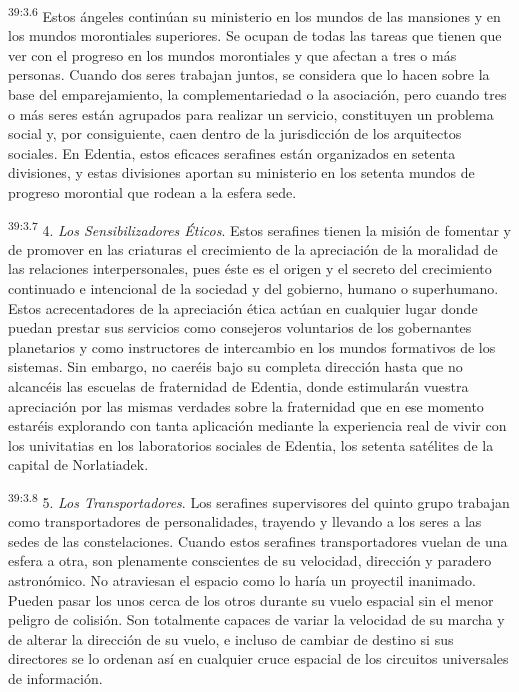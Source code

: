 \par
\textsuperscript{39:3.6} Estos ángeles continúan su ministerio en los mundos de las mansiones y en los mundos morontiales superiores. Se ocupan de todas las tareas que tienen que ver con el progreso en los mundos morontiales y que afectan a tres o más personas. Cuando dos seres trabajan juntos, se considera que lo hacen sobre la base del emparejamiento, la complementariedad o la asociación, pero cuando tres o más seres están agrupados para realizar un servicio, constituyen un problema social y, por consiguiente, caen dentro de la jurisdicción de los arquitectos sociales. En Edentia, estos eficaces serafines están organizados en setenta divisiones, y estas divisiones aportan su ministerio en los setenta mundos de progreso morontial que rodean a la esfera sede.

\par
\textsuperscript{39:3.7} 4. \textit{Los Sensibilizadores Éticos}. Estos serafines tienen la misión de fomentar y de promover en las criaturas el crecimiento de la apreciación de la moralidad de las relaciones interpersonales, pues éste es el origen y el secreto del crecimiento continuado e intencional de la sociedad y del gobierno, humano o superhumano. Estos acrecentadores de la apreciación ética actúan en cualquier lugar donde puedan prestar sus servicios como consejeros voluntarios de los gobernantes planetarios y como instructores de intercambio en los mundos formativos de los sistemas. Sin embargo, no caeréis bajo su completa dirección hasta que no alcancéis las escuelas de fraternidad de Edentia, donde estimularán vuestra apreciación por las mismas verdades sobre la fraternidad que en ese momento estaréis explorando con tanta aplicación mediante la experiencia real de vivir con los univitatias en los laboratorios sociales de Edentia, los setenta satélites de la capital de Norlatiadek.

\par
\textsuperscript{39:3.8} 5. \textit{Los Transportadores}. Los serafines supervisores del quinto grupo trabajan como transportadores de personalidades, trayendo y llevando a los seres a las sedes de las constelaciones. Cuando estos serafines transportadores vuelan de una esfera a otra, son plenamente conscientes de su velocidad, dirección y paradero astronómico. No atraviesan el espacio como lo haría un proyectil inanimado. Pueden pasar los unos cerca de los otros durante su vuelo espacial sin el menor peligro de colisión. Son totalmente capaces de variar la velocidad de su marcha y de alterar la dirección de su vuelo, e incluso de cambiar de destino si sus directores se lo ordenan así en cualquier cruce espacial de los circuitos universales de información.

